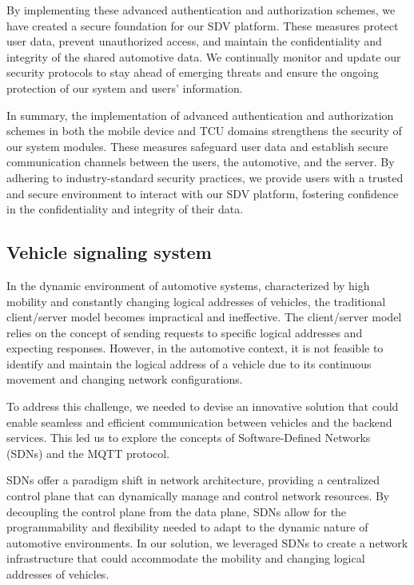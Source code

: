 \documentclass[
12pt,
oneside, 
onehalfspacing, 
nolistspacing, 
parskip, 
chapterinoneline, 
]{AASTCOMPUTER}
\begin{document}
By implementing these advanced authentication and authorization schemes, we have created a secure foundation for our SDV platform. These measures protect user data, prevent unauthorized access, and maintain the confidentiality and integrity of the shared automotive data. We continually monitor and update our security protocols to stay ahead of emerging threats and ensure the ongoing protection of our system and users' information.

In summary, the implementation of advanced authentication and authorization schemes in both the mobile device and TCU domains strengthens the security of our system modules. These measures safeguard user data and establish secure communication channels between the users, the automotive, and the server. By adhering to industry-standard security practices, we provide users with a trusted and secure environment to interact with our SDV platform, fostering confidence in the confidentiality and integrity of their data.

\subsection{Vehicle signaling system}
In the dynamic environment of automotive systems, characterized by high mobility and constantly changing logical addresses of vehicles, the traditional client/server model becomes impractical and ineffective. The client/server model relies on the concept of sending requests to specific logical addresses and expecting responses. However, in the automotive context, it is not feasible to identify and maintain the logical address of a vehicle due to its continuous movement and changing network configurations.

To address this challenge, we needed to devise an innovative solution that could enable seamless and efficient communication between vehicles and the backend services. This led us to explore the concepts of Software-Defined Networks (SDNs) and the MQTT\cite{yokotani2016comparison} protocol.

SDNs offer a paradigm shift in network architecture, providing a centralized control plane that can dynamically manage and control network resources. By decoupling the control plane from the data plane, SDNs allow for the programmability and flexibility needed to adapt to the dynamic nature of automotive environments. In our solution, we leveraged SDNs to create a network infrastructure that could accommodate the mobility and changing logical addresses of vehicles.
\end{document}
